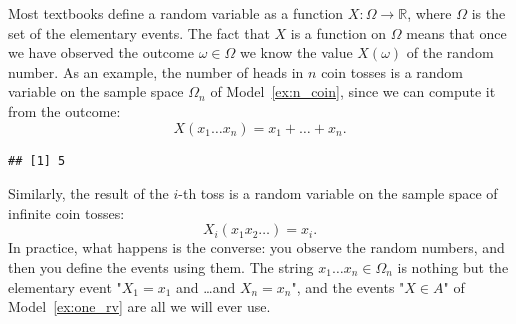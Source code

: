 \begin{remark}
	\label{r:standard_rv}
	Most textbooks define a random variable as a function $X: \Omega \to \mathbb R$, where $\Omega$ is the set of the elementary events. The fact that $X$ is a function on $\Omega$ means that once we have observed the outcome $\omega \in \Omega$ we know the value $X(\omega)$ of the random number. As an example, the number of heads in $n$ coin tosses is a random variable on the sample space $\Omega_n$ of Model~\ref{ex:n_coin}, since we can compute it from the outcome: 
	\begin{equation}
		\label{e:rv_heads}
		X(x_1 \ldots x_n) = x_1 + \ldots + x_n. 
	\end{equation}
\begin{knitrout}
\color{fgcolor}\begin{kframe}
\begin{alltt}
 \hlkwb{<-} \hldef{(}\hldef{(}\hldef{,} \hldef{),} \hldef{,}  \hldef{=} \hldef{)}    
                                      
\end{alltt}
\begin{verbatim}
## [1] 5
\end{verbatim}
\end{kframe}
\end{knitrout}
	Similarly, the result of the $i$-th toss is a random variable on the sample space of infinite coin tosses: 
	\begin{equation}
		\label{e:rv_toss}
		X_i(x_1 x_2 \ldots) = x_i. 
	\end{equation}
	In practice, what happens is the converse: you observe the random numbers, and then you define the events using them. The string $x_1 \ldots x_n \in \Omega_n$ is nothing but the elementary event "$X_1 = x_1$ and \ldots and $X_n = x_n$", and the events "$X \in A$" of Model~\ref{ex:one_rv} are all we will ever use. 
\end{remark}


